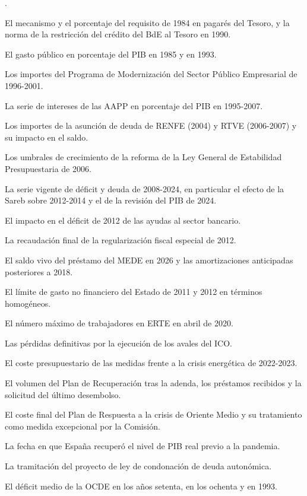 \documentclass[10pt,a4paper]{article}
\newcounter{numitem}
\newenvironment{lnum}
      {\begin{list}{\arabic{numitem}.}{%
          \usecounter{numitem}%
          \setlength{\leftmargin}{1cm}%
          \setlength{\parskip}{3pt}%
          \setlength{\itemsep}{0pt}%
          \setlength{\parsep}{0pt}%
      }}
      {\end{list}}
\begin{document}
\begin{lnum}
    \item El mecanismo y el porcentaje del requisito de 1984 en pagarés del Tesoro, y la norma de la restricción del crédito del BdE al Tesoro en 1990.
    \item El gasto público en porcentaje del PIB en 1985 y en 1993.
    \item Los importes del Programa de Modernización del Sector Público Empresarial de 1996-2001.
    \item La serie de intereses de las AAPP en porcentaje del PIB en 1995-2007.
    \item Los importes de la asunción de deuda de RENFE (2004) y RTVE (2006-2007) y su impacto en el saldo.
    \item Los umbrales de crecimiento de la reforma de la Ley General de Estabilidad Presupuestaria de 2006.
    \item La serie vigente de déficit y deuda de 2008-2024, en particular el efecto de la Sareb sobre 2012-2014 y el de la revisión del PIB de 2024.
    \item El impacto en el déficit de 2012 de las ayudas al sector bancario.
    \item La recaudación final de la regularización fiscal especial de 2012.
    \item El saldo vivo del préstamo del MEDE en 2026 y las amortizaciones anticipadas posteriores a 2018.
    \item El límite de gasto no financiero del Estado de 2011 y 2012 en términos homogéneos.
    \item El número máximo de trabajadores en ERTE en abril de 2020.
    \item Las pérdidas definitivas por la ejecución de los avales del ICO.
    \item El coste presupuestario de las medidas frente a la crisis energética de 2022-2023.
    \item El volumen del Plan de Recuperación tras la adenda, los préstamos recibidos y la solicitud del último desembolso.
    \item El coste final del Plan de Respuesta a la crisis de Oriente Medio y su tratamiento como medida excepcional por la Comisión.
    \item La fecha en que España recuperó el nivel de PIB real previo a la pandemia.
    \item La tramitación del proyecto de ley de condonación de deuda autonómica.
    \item El déficit medio de la OCDE en los años setenta, en los ochenta y en 1993.

\end{lnum}
\end{document}
